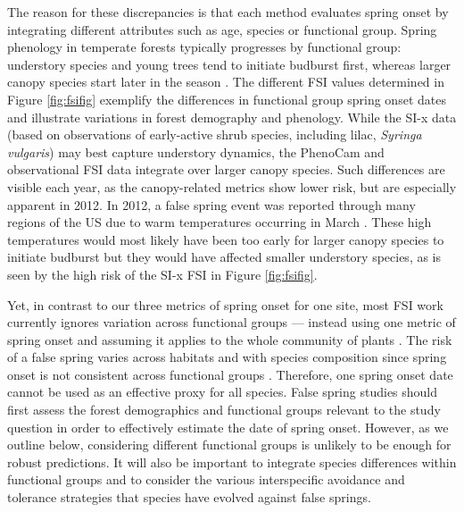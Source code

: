\documentclass{article}\usepackage[]{graphicx}\usepackage[]{color}
\begin{document}
The reason for these discrepancies is that each method evaluates spring onset by integrating different attributes such as age, species or functional group. Spring phenology in temperate forests typically progresses by functional group: understory species and young trees tend to initiate budburst first, whereas larger canopy species start later in the season \citep{Richardson2009, Xin2016}. The different FSI values determined in Figure \ref{fig:fsifig} exemplify the differences in functional group spring onset dates and illustrate variations in forest demography and phenology. While the SI-x data (based on observations of early-active shrub species, including lilac, \emph{Syringa vulgaris}) may best capture understory dynamics, the PhenoCam and observational FSI data integrate over larger canopy species. Such differences are visible each year, as the canopy-related metrics show lower risk, but are especially apparent in 2012. In 2012, a false spring event was reported through many regions of the US due to warm temperatures occurring in March \citep{Ault2015}. These high temperatures would most likely have been too early for larger canopy species to initiate budburst but they would have affected smaller understory species, as is seen by the high risk of the SI-x FSI in Figure \ref{fig:fsifig}. 

Yet, in contrast to our three metrics of spring onset for one site, most FSI work currently ignores variation across functional groups --- instead using one metric of spring onset and assuming it applies to the whole community of plants \citep{Allstadt2015, Marino2011, Mehdipoor2017, Peterson2014}. The risk of a false spring varies across habitats and with species composition since spring onset is not consistent across functional groups \citep{Martin2010}. Therefore, one spring onset date cannot be used as an effective proxy for all species. False spring studies should first assess the forest demographics and functional groups relevant to the study question in order to effectively estimate the date of spring onset. However, as we outline below, considering different functional groups is unlikely to be enough for robust predictions. It will also be important to integrate species differences within functional groups and to consider the various interspecific avoidance and tolerance strategies that species have evolved against false springs. 
\end{document}
